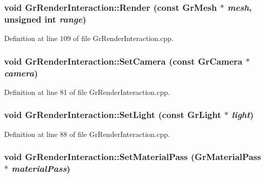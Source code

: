\begin{CompactItemize}
{\subsubsection[{Render}]{\setlength{\rightskip}{0pt plus 5cm}void GrRenderInteraction::Render (const {\bf GrMesh} $\ast$ {\em mesh}, \/  unsigned int {\em range})}}
\label{class_gr_render_interaction_3542d05d0d9bd8f3ef237d46c518c2d4}




Definition at line 109 of file GrRenderInteraction.cpp.\hypertarget{class_gr_render_interaction_8ffc348f96b4ab387fcd52dc1a229880}{
\subsubsection[{SetCamera}]{\setlength{\rightskip}{0pt plus 5cm}void GrRenderInteraction::SetCamera (const {\bf GrCamera} $\ast$ {\em camera})}}
\label{class_gr_render_interaction_8ffc348f96b4ab387fcd52dc1a229880}




Definition at line 81 of file GrRenderInteraction.cpp.\hypertarget{class_gr_render_interaction_83f3aad936c6f009ddefd6178a9861c4}{
\subsubsection[{SetLight}]{\setlength{\rightskip}{0pt plus 5cm}void GrRenderInteraction::SetLight (const {\bf GrLight} $\ast$ {\em light})}}
\label{class_gr_render_interaction_83f3aad936c6f009ddefd6178a9861c4}




Definition at line 88 of file GrRenderInteraction.cpp.\hypertarget{class_gr_render_interaction_0d365eacc1fa2057eba4c4589842a377}{
\subsubsection[{SetMaterialPass}]{\setlength{\rightskip}{0pt plus 5cm}void GrRenderInteraction::SetMaterialPass ({\bf GrMaterialPass} $\ast$ {\em materialPass})}}
\label{class_gr_render_interaction_0d365eacc1fa2057eba4c4589842a377}





\end{CompactItemize}
